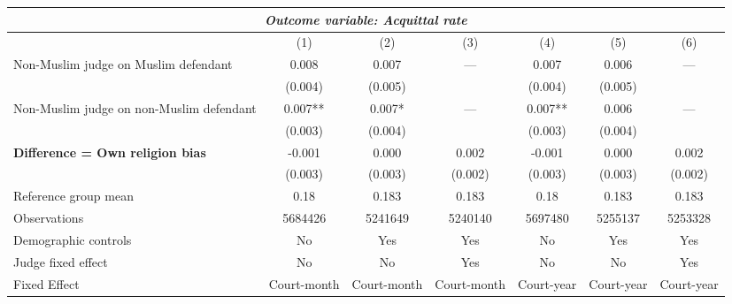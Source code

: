 {
\def\sym#1{\ifmmode^{#1}\else\(^{#1}\)\fi}
\begin{tabular}{l*{6}{c}}
  \hline\hline
\multicolumn{7}{c}{\textit{Outcome variable: Acquittal rate}}\\
\hline
&\multicolumn{1}{c}{(1)}&\multicolumn{1}{c}{(2)}&\multicolumn{1}{c}{(3)}&\multicolumn{1}{c}{(4)}&\multicolumn{1}{c}{(5)}&\multicolumn{1}{c}{(6)}\\
\hline
Non-Muslim judge on Muslim defendant \hspace{15mm}& 0.008 & 0.007 & --- & 0.007 & 0.006 & --- \\
& (0.004) & (0.005) &  & (0.004) &(0.005) &  \\
Non-Muslim judge on non-Muslim defendant \hspace{15mm}& 0.007** & 0.007* & ---& 0.007** & 0.006 & --- \\
& (0.003) & (0.004) &  & (0.003) & (0.004) &  \\
\textbf{Difference = Own religion bias} & -0.001 & 0.000 & 0.002 & -0.001 & 0.000 & 0.002 \\
& (0.003) & (0.003) & (0.002) & (0.003) & (0.003) & (0.002) \\
\hline
Reference group mean & 0.18 & 0.183 & 0.183 & 0.18 & 0.183 & 0.183 \\
Observations & 5684426 & 5241649 & 5240140 & 5697480 & 5255137 & 5253328 \\
Demographic controls & No & Yes & Yes & No & Yes & Yes \\
Judge fixed effect & No & No & Yes & No & No & Yes \\
Fixed Effect & Court-month & Court-month & Court-month & Court-year & Court-year & Court-year \\
\hline\hline
\end{tabular}
}
 
